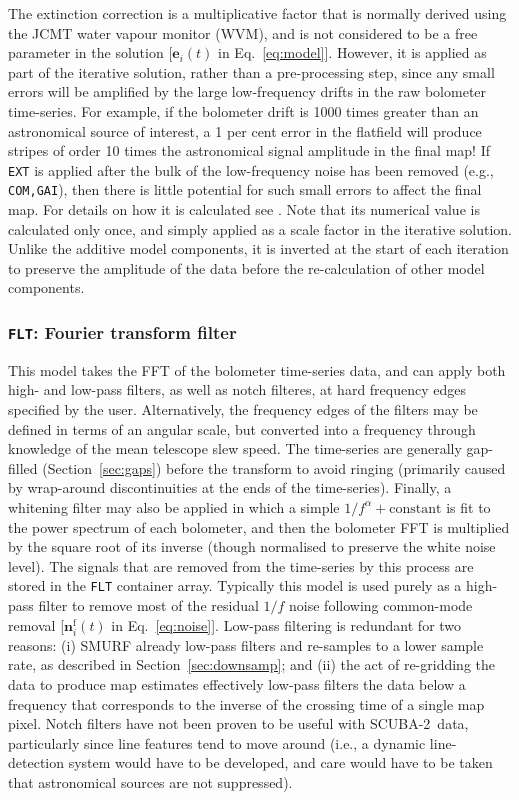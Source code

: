\documentclass[useAMS,usenatbib,nofootinbib]{mn2e}
\newcommand{\scuba}{SCUBA-2}
\newcommand{\model}[1]{\texttt{#1}}
\begin{document}
The extinction correction is a multiplicative factor that is normally
derived using the JCMT water vapour monitor (WVM), and is not
considered to be a free parameter in the solution [$\mathbf{e}_i(t)$
in Eq.~\ref{eq:model}]. However, it is applied as part of the
iterative solution, rather than a pre-processing step, since any small
errors will be amplified by the large low-frequency drifts in the raw
bolometer time-series. For example, if the bolometer drift is 1000
times greater than an astronomical source of interest, a 1 per cent
error in the flatfield will produce stripes of order 10 times the
astronomical signal amplitude in the final map! If \model{EXT} is
applied after the bulk of the low-frequency noise has been removed
(e.g., \model{COM,GAI}), then there is little potential for such small
errors to affect the final map.  For details on how it is calculated
see \citet{dempsey2012}. Note that its numerical value is calculated
only once, and simply applied as a scale factor in the iterative
solution. Unlike the additive model components, it is inverted at the
start of each iteration to preserve the amplitude of the data before
the re-calculation of other model components.

\subsubsection{\model{FLT}: Fourier transform filter}
\label{sec:flt}

This model takes the FFT of the bolometer time-series data, and can
apply both high- and low-pass filters, as well as notch filteres, at
hard frequency edges specified by the user. Alternatively, the
frequency edges of the filters may be defined in terms of an angular
scale, but converted into a frequency through knowledge of the mean
telescope slew speed. The time-series are generally gap-filled
(Section~\ref{sec:gaps}) before the transform to avoid ringing
(primarily caused by wrap-around discontinuities at the ends of the
time-series). Finally, a whitening filter may also be applied in which
a simple $1/f^\alpha + \mathrm{constant}$ is fit to the power spectrum
of each bolometer, and then the bolometer FFT is multiplied by the
square root of its inverse (though normalised to preserve the white
noise level).  The signals that are removed from the time-series by
this process are stored in the \model{FLT} container array. Typically
this model is used purely as a high-pass filter to remove most of the
residual $1/f$ noise following common-mode removal
[$\mathbf{n}^\mathrm{f}_i(t)$ in Eq.~\ref{eq:noise}]. Low-pass
filtering is redundant for two reasons: (i) SMURF already low-pass
filters and re-samples to a lower sample rate, as described in
Section~\ref{sec:downsamp}; and (ii) the act of re-gridding the data
to produce map estimates effectively low-pass filters the data below a
frequency that corresponds to the inverse of the crossing time of a
single map pixel. Notch filters have not been proven to be useful with
\scuba\ data, particularly since line features tend to move around
(i.e., a dynamic line-detection system would have to be developed, and
care would have to be taken that astronomical sources are not
suppressed).
\end{document}

